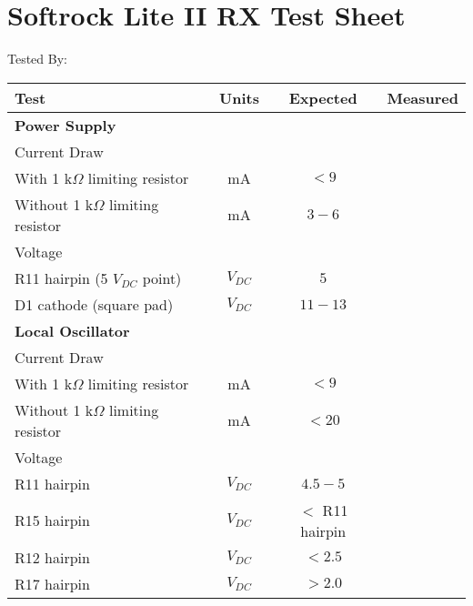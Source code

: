 \documentclass{article}[12pt]
\newcommand{\measline}{\underline{\hspace{0.75in}}}
\begin{document}
\section*{Softrock Lite II RX Test Sheet}
\bigskip
Tested By: \underline{\hspace{2in}}
\bigskip
\begin{longtable}{lccc}
\bf Test & \bf Units & \bf Expected & \bf Measured \\
\hline
\multicolumn{4}{l}{\bf Power Supply} \\
\multicolumn{4}{l}{\hspace{0.25in}Current Draw} \\
\hspace{0.5in}With 1 k$\Omega$ limiting resistor & mA & $< 9$ & \measline \\
\hspace{0.5in}Without 1 k$\Omega$ limiting resistor & mA & $3-6$ & \measline \\
\multicolumn{4}{l}{\hspace{0.25in}Voltage} \\
\hspace{0.5in}R11 hairpin (5 $V_{DC}$ point) & $V_{DC}$ & $5$ & \measline \\
\hspace{0.5in}D1 cathode (square pad) & $V_{DC}$ & $11-13$ & \measline \\
\hline
\multicolumn{4}{l}{\bf Local Oscillator} \\
\multicolumn{4}{l}{\hspace{0.25in}Current Draw} \\
\hspace{0.5in}With 1 k$\Omega$ limiting resistor & mA & $< 9$ & \measline \\
\hspace{0.5in}Without 1 k$\Omega$ limiting resistor & mA & $< 20$ & \measline \\
\multicolumn{4}{l}{\hspace{0.25in}Voltage} \\
\hspace{0.5in}R11 hairpin & $V_{DC}$ & $4.5 - 5$ & \measline \\
\hspace{0.5in}R15 hairpin & $V_{DC}$ & $<$ R11 hairpin & \measline \\
\hspace{0.5in}R12 hairpin & $V_{DC}$ & $< 2.5$ & \measline \\
\hspace{0.5in}R17 hairpin & $V_{DC}$ & $> 2.0$ & \measline \\

\end{longtable}
\end{document}
